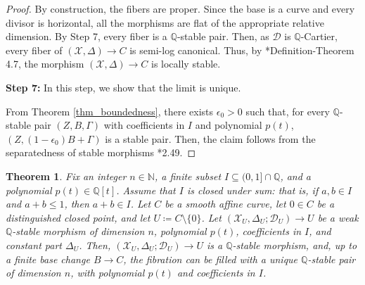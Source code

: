 \documentclass{amsart}
\newcommand{\bQ}{\mathbb{Q}}
\newcommand{\cD}{\mathcal{D}}
\newcommand{\cX}{\mathcal{X}}
\newtheorem{theorem}{Theorem}[section]
\theoremstyle{definition}
\newcommand{\rar}{\rightarrow}
\renewcommand{\qq}{\mathbb{Q}}
\begin{document}
\begin{proof}
By construction, the fibers are proper.
Since the base is a curve and every divisor is horizontal, all the morphisms are flat of the appropriate relative dimension.
By Step 7, every fiber is a $\bQ$-stable pair.
Then, as $\cD$ is $\qq$-Cartier, every fiber of $(\cX,\Delta) \rar C$ is semi-log canonical.
Thus, by \cite{kol_new}*{Definition-Theorem 4.7}, the morphism $(\cX,\Delta) \rar C$ is locally stable.

{\bf Step 7:} In this step, we show that the limit is unique.

From Theorem \ref{thm_boundedness}, there exists $\epsilon_0 > 0$ such that, for every $\bQ$-stable pair $(Z,B,\Gamma)$ with coefficients in $I$ and polynomial $p(t)$, $(Z,(1-\epsilon_0)B + \Gamma)$ is a stable pair.
Then, the claim follows from the separatedness of stable morphisms \cite{kol_new}*{2.49}.
\end{proof}



\begin{theorem}\label{Thm_properness}
Fix an integer $n\in \mathbb{N}$, a finite subset $I\subseteq (0,1] \cap \mathbb{Q}$, and a polynomial $p(t) \in \mathbb{Q}[t]$.
Assume that $I$ is closed under sum: that is, if $a,b \in I$ and $a+b \leq 1$, then $a+b \in I$.
Let $C$ be a smooth affine curve, let $0 \in C$ be a distinguished closed point, and let $U\coloneqq C \setminus \{ 0 \}$.
Let $(\cX_U, \Delta_U; \cD_U) \rightarrow U$ be a weak $\bQ$-stable morphism of dimension $n$, polynomial $p(t)$, coefficients in $I$, and constant part $\Delta_U$.
Then, $(\cX_U, \Delta_U; \cD_U) \rightarrow U$ is a $\bQ$-stable morphism, and, up to a finite base change $B \rar C$, the fibration can be filled with a unique $\bQ$-stable pair of dimension $n$, with polynomial $p(t)$ and coefficients in $I$.
\end{theorem}
\end{document}
